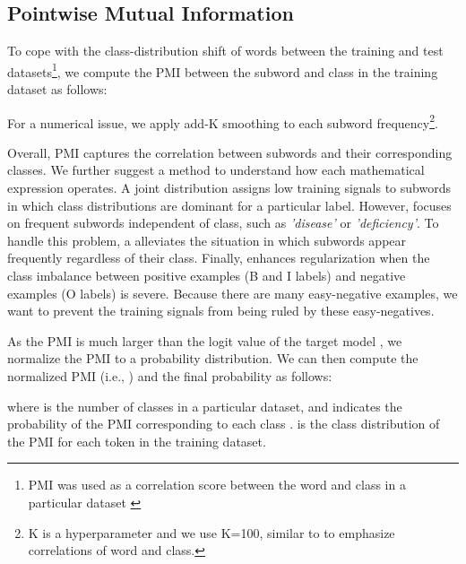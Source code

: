 \documentclass[11pt]{article}
\begin{document}
\subsection{Pointwise Mutual Information}
\label{sec:pmi}
To cope with the class-distribution shift of words between the training and test datasets\footnote{PMI was used as a correlation score between the word and class in a particular dataset \cite{gururangan2018annotation}
}, we compute the PMI between the subword and class in the training dataset as follows:

\vspace{-0.2cm}

For a numerical issue, we apply add-K smoothing to each subword frequency\footnote{K is a hyperparameter and we use K=100, similar to \cite{gururangan2018annotation} to emphasize correlations of word and class.}.

Overall, PMI captures the correlation between subwords and their corresponding classes.
We further suggest a method to understand how each mathematical expression operates.
A joint distribution  assigns low training signals to subwords in which class distributions are dominant for a particular label.
However,  focuses on frequent subwords independent of class, such as \textit{'disease'} or \textit{'deficiency'}. 
To handle this problem, a  alleviates the situation in which subwords appear frequently regardless of their class. 
Finally,  enhances regularization when the class imbalance between positive examples (B and I labels) and negative examples (O labels) is severe.
Because there are many easy-negative examples, we want to prevent the training signals from being ruled by these easy-negatives.


As the PMI is much larger than the logit value of the target model , we normalize the PMI to a probability distribution. 
We can then compute the normalized PMI (i.e., ) and the final probability  as follows:



where  is the number of classes in a particular dataset, and  indicates the probability of the PMI corresponding to each class .
 is the class distribution of the PMI for each token  in the training dataset.
\end{document}
